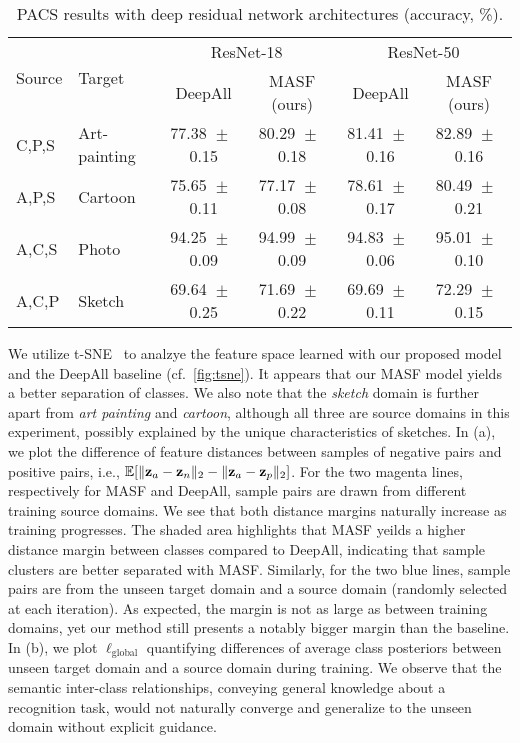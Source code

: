 \documentclass{article}
\newcommand{\LabelLossPair}{\ell_\mathrm{global}}
\DeclarePairedDelimiter{\norm}{\lVert}{\rVert}
\newcommand{\expec}{\mathbb{E}}
\def\*#1{\mathbf{#1}}
\begin{document}
\begin{table}[h!]
    \centering
    \let\oldpm\pm
    \renewcommand{\pm}{\,\oldpm\,}
    \caption{PACS results with deep residual network architectures (accuracy, \%).}
    \label{tab:resnet_jigen}
    \begin{adjustbox}{scale=.85}
    \begin{tabular}{llcccc}
        \toprule
   \multirow{2}{*}{Source}  &  \multirow{2}{*}{Target}  &  \multicolumn{2}{c}{ResNet-18} & \multicolumn{2}{c}{ResNet-50} \\
\cmidrule(lr){3-4} \cmidrule(lr){5-6}
       &   & DeepAll & MASF (ours)      & DeepAll & MASF (ours) \\
\midrule
{C},{P},{S}       &  Art-painting        & 77.38$\pm$0.15      & 80.29$\pm$0.18    & 81.41$\pm$0.16    & 82.89$\pm$0.16 \\
{A},{P},{S}       &  Cartoon             & 75.65$\pm$0.11      & 77.17$\pm$0.08    & 78.61$\pm$0.17    & 80.49$\pm$0.21 \\
{A},{C},{S}       &  Photo               & 94.25$\pm$0.09      & 94.99$\pm$0.09    & 94.83$\pm$0.06    & 95.01$\pm$0.10 \\
{A},{C},{P}       &  Sketch              & 69.64$\pm$0.25      & 71.69$\pm$0.22    & 69.69$\pm$0.11    & 72.29$\pm$0.15 \\
        \bottomrule
    \end{tabular}
    \end{adjustbox}
\end{table}

We utilize t-SNE~\citep{maaten2008visualizing} to analzye the feature space learned with our proposed model and the DeepAll baseline (cf.~\cref{fig:tsne}). It appears that our MASF model yields a better separation of classes. We also note that the \emph{sketch} domain is further apart from \emph{art painting} and \emph{cartoon}, although all three are source domains in this experiment, possibly explained by the unique characteristics of sketches. In  (a), we plot the difference of feature distances between samples of negative pairs and positive pairs, i.e., $\expec[\norm{\*z_a- \*z_n}_2 - \norm{\*z_a - \*z_p}_2]$. 
For the two magenta lines, respectively for MASF and DeepAll, sample pairs are drawn from different training source domains.
We see that both distance margins naturally increase as training progresses. The shaded area highlights that MASF yeilds a higher distance margin between classes compared to DeepAll, indicating that sample clusters are better separated with MASF.
Similarly, for the two blue lines, sample pairs are from the unseen target domain and a source domain (randomly selected at each iteration). As expected, the margin is not as large as between training domains, yet our method still presents a notably bigger margin than the baseline. In  (b), we plot $\LabelLossPair$ quantifying differences of average class posteriors between unseen target domain and a source domain during training. We observe that the semantic inter-class relationships, conveying general knowledge about a recognition task, would not naturally converge and generalize to the unseen domain without explicit guidance.
\end{document}
